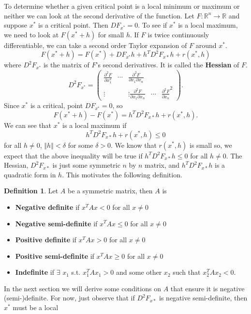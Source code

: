 \documentclass[12pt,reqno]{amsart}
\theoremstyle{definition}
\newtheorem{definition}{Definition}[section]
\def\R{\mathbb{R}}
\newcommand{\norm}[1]{\left\Vert {#1} \right\Vert}
\renewcommand{\to}{{\rightarrow}}
\begin{document}
To determine whether a given critical point is a local minimum or
maximum or neither we can look at the second derivative of the
function. Let $F:\R^n \to \R$ and suppose $x^*$ is a critical
point. Then $DF_{x^*} = 0$. To see if $x^*$ is a local maximum, we
need to look at $F(x^* + h)$ for small $h$. If $F$ is twice
continuously differentiable, we can take a second order Taylor
expansion of $F$ around $x^*$.
\[ F(x^*+h) = F(x^*) + DF_{x^*} h + h^T D^2 F_{x*} h + r(x^*,h) \]
where $D^2 F_{x^*}$ is the matrix of $F$'s second derivatives. It is
called the \textbf{Hessian} of $F$. 
\[ D^2 F_{x^*} = \begin{pmatrix} \frac{\partial ^2 F}{\partial x_1^2}
  & \cdots & \frac{\partial ^2 F}{\partial x_1\partial x_n} \\
  \vdots & & \vdots
  \frac{\partial ^2 F}{\partial x_1\partial x_n} & \cdots &
  \frac{\partial ^2 F}{\partial x_n}^2 \end{pmatrix}.
\]
Since $x^*$ is a critical, point $DF_{x^*} = 0$, so
\[ F(x^*+h) - F(x^*) = h^T D^2 F_{x*} h + r(x^*,h). \]
We can see that $x^*$ is a local maximum if 
\[ h^T D^2 F_{x*} h + r(x^*,h) \leq 0 \]
for all $h \neq 0$, $\norm{h} < \delta$ for some $\delta > 0$. We know
that $r(x^*,h)$ is small so, we expect that the above inequality will
be true if $h^T D^2 F_{x*} h \leq 0$ for all $h \neq 0$. The Hessian,
$D^2 F_{x*}$ is just some symmetric $n$ by $n$ matrix, and $h^T D^2
F_{x*} h$ is a quadratic form in $h$. This motivates the following
definition. 
\begin{definition}
  Let $A$ be a symmetric matrix, then $A$ is
  \begin{itemize}
  \item \textbf{Negative definite} if $x^T A x < 0$ for all $x \neq 0$
  \item \textbf{Negative semi-definite} if $x^T A x \leq 0$ for all $x \neq 0$
  \item \textbf{Positive definite} if $x^T A x > 0$ for all $x \neq 0$
  \item \textbf{Positive semi-definite} if $x^T A x \geq 0$ for all $x
    \neq 0$
  \item \textbf{Indefinite} if $\exists$ $x_1$ s.t. $x_1^T A x_1 > 0$ and
    some other $x_2$ such that $x_2^T A x_2 < 0$.
  \end{itemize}  
\end{definition}
In the next section we will derive some conditions on $A$ that ensure
it is negative (semi-)definite. For now, just observe that if $D^2
F_{x*}$ is negative semi-definite, then $x^*$ must be a local
\end{document}
